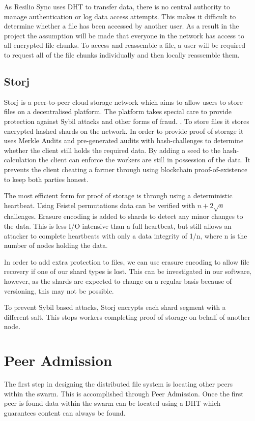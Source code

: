 \documentclass[a4paper, 11pt, twocolumn, twoside]{report}
\begin{document}
As Resilio Sync uses DHT to transfer data, there is no central authority to manage authentication or log data access attempts. This makes it difficult to determine whether a file has been accessed by another user. \citep{farina2014bittorrent} As a result in the project the assumption will be made that everyone in the network has access to all encrypted file chunks. To access and reassemble a file, a user will be required to request all of the file chunks individually and then locally reassemble them.

\subsection{Storj}
Storj is a peer-to-peer cloud storage network which aims to allow users to store files on a decentralised platform. The platform takes special care to provide protection against Sybil attacks and other forms of fraud. \citep{Wilkinson14storja}. To store files it stores encrypted hashed shards on the network. In order to provide proof of storage it uses Merkle Audits and pre-generated audits with hash-challenges to determine whether the client still holds the required data. By adding a seed to the hash-calculation the client can enforce the workers are still in possession of the data. It prevents the client cheating a farmer through using blockchain proof-of-existence to keep both parties honest.

The most efficient form for proof of storage is through using a deterministic heartbeat. Using Feistel permutations data can be verified with $n + 2 \sqrt{n}$ challenges. Erasure encoding is added to shards to detect any minor changes to the data. This is less I/O intensive than a full heartbeat, but still allows an attacker to complete heartbeats with only a data integrity of 1/n, where n is the number of nodes holding the data.

In order to add extra protection to files, we can use erasure encoding to allow file recovery if one of our shard types is lost. This can be investigated in our software, however, as the shards are expected to change on a regular basis because of versioning, this may not be possible.

To prevent Sybil based attacks, Storj encrypts each shard segment with a different salt. This stops workers completing proof of storage on behalf of another node.

\section{Peer Admission}
The first step in designing the distributed file system is locating other peers within the swarm. This is accomplished through Peer Admission. Once the first peer is found data within the swarm can be located using a DHT which guarantees content can always be found.
\end{document}
